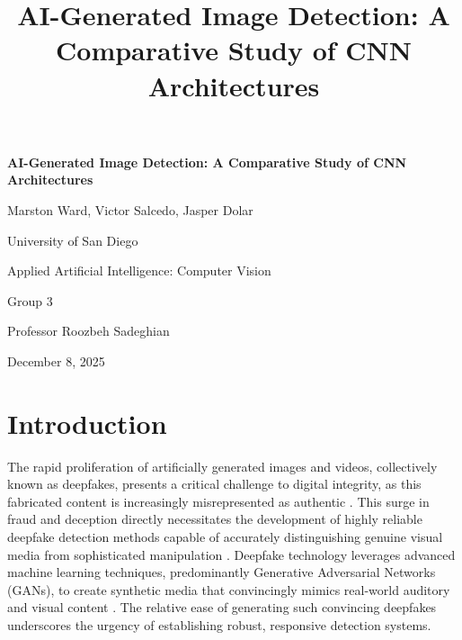 \documentclass[man,12pt,letterpaper,donotrepeattitle,floatsintext]{apa7}
\title{AI-Generated Image Detection: A Comparative Study of CNN Architectures}
\begin{document}

\begin{titlepage}
    \centering
    {\LARGE\bfseries AI-Generated Image Detection: A Comparative Study of CNN Architectures\par}
    \vspace{1.5cm}
    {\large Marston Ward, Victor Salcedo, Jasper Dolar\par}
    \vspace{0.5cm}
    {\large University of San Diego\par}
    \vspace{0.5cm}
    {\large Applied Artificial Intelligence: Computer Vision\par}
    \vspace{0.3cm}
    {\large Group 3\par}
    \vspace{0.5cm}
    {\large Professor Roozbeh Sadeghian\par}
    \vspace{0.5cm}
    {\large December 8, 2025\par}
    \vfill
\end{titlepage}


\thispagestyle{empty}
\newpage

\section{Introduction}
The rapid proliferation of artificially generated images and videos, 
collectively known as deepfakes, presents a critical challenge to digital integrity, 
as this fabricated content is increasingly misrepresented as authentic 
\citep{Kingsley2024, Maharjan2023}. This surge in fraud and deception directly
necessitates the development of highly reliable deepfake detection methods capable 
of accurately distinguishing genuine visual media from sophisticated manipulation 
\citep{ST2022}. Deepfake technology leverages advanced machine learning techniques, 
predominantly Generative Adversarial Networks (GANs), to create synthetic media 
that convincingly mimics real-world auditory and visual content 
\citep{Kingsley2024, Maharjan2023}. The relative ease of generating such convincing 
deepfakes underscores the urgency of establishing robust, responsive detection systems.
\end{document}

